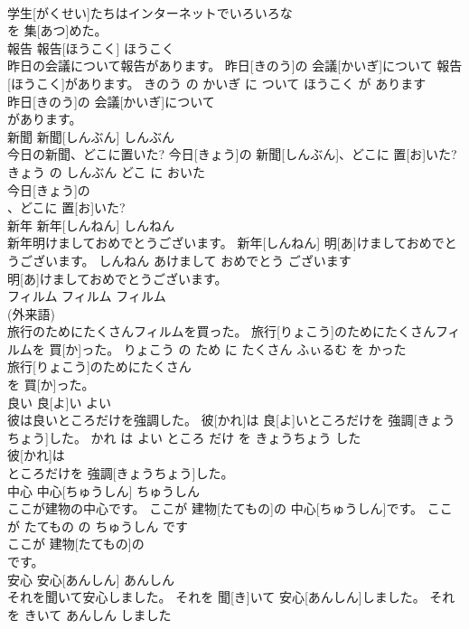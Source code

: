 \documentclass[8pt]{extreport}
\begin{document}
\begin{CJK}{UTF8}{min}
\\	学生[がくせい]たちはインターネットでいろいろな
\\	を 集[あつ]めた。		
\\	報告	報告[ほうこく]	ほうこく	
\\	昨日の会議について報告があります。	昨日[きのう]の 会議[かいぎ]について 報告[ほうこく]があります。	きのう の かいぎ に ついて ほうこく が あります	
\\	昨日[きのう]の 会議[かいぎ]について
\\	があります。		
\\	新聞	新聞[しんぶん]	しんぶん	
\\	今日の新聞、どこに置いた?	今日[きょう]の 新聞[しんぶん]、どこに 置[お]いた?	きょう の しんぶん どこ に おいた	
\\	今日[きょう]の
\\	、どこに 置[お]いた?		
\\	新年	新年[しんねん]	しんねん	
\\	新年明けましておめでとうございます。	新年[しんねん] 明[あ]けましておめでとうございます。	しんねん あけまして おめでとう ございます	
\\	明[あ]けましておめでとうございます。		
\\	フィルム	フィルム	フィルム	
\\	(外来語)		
\\	旅行のためにたくさんフィルムを買った。	旅行[りょこう]のためにたくさんフィルムを 買[か]った。	りょこう の ため に たくさん ふぃるむ を かった	
\\	旅行[りょこう]のためにたくさん
\\	を 買[か]った。		
\\	良い	良[よ]い	よい	
\\	彼は良いところだけを強調した。	彼[かれ]は 良[よ]いところだけを 強調[きょうちょう]した。	かれ は よい ところ だけ を きょうちょう した	
\\	彼[かれ]は
\\	ところだけを 強調[きょうちょう]した。		
\\	中心	中心[ちゅうしん]	ちゅうしん	
\\	ここが建物の中心です。	ここが 建物[たてもの]の 中心[ちゅうしん]です。	ここ が たてもの の ちゅうしん です	
\\	ここが 建物[たてもの]の
\\	です。		
\\	安心	安心[あんしん]	あんしん	
\\	それを聞いて安心しました。	それを 聞[き]いて 安心[あんしん]しました。	それ を きいて あんしん しました	

\end{CJK}
\end{document}
